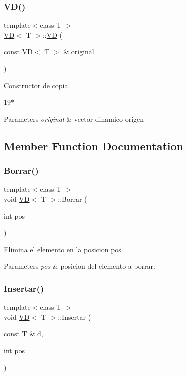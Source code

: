 \subsubsection{\texorpdfstring{V\+D()}{VD()}\hspace{0.1cm}{\footnotesize\ttfamily [2/2]}}
{\footnotesize\ttfamily template$<$class T $>$ \\
\hyperlink{class_v_d}{VD}$<$ T $>$\+::\hyperlink{class_v_d}{VD} (\begin{DoxyParamCaption}\item[{const \hyperlink{class_v_d}{VD}$<$ T $>$ \&}]{original }\end{DoxyParamCaption})}



Constructor de copia. 

19$\ast$
\begin{DoxyParams}{Parameters}
{\em original} & vector dinamico origen \\
\hline
\end{DoxyParams}


\subsection{Member Function Documentation}
\mbox{\label{class_v_d_a13528c6fae34510d10699f426de88e27}} 
\subsubsection{\texorpdfstring{Borrar()}{Borrar()}}
{\footnotesize\ttfamily template$<$class T $>$ \\
void \hyperlink{class_v_d}{VD}$<$ T $>$\+::Borrar (\begin{DoxyParamCaption}\item[{int}]{pos }\end{DoxyParamCaption})}



Elimina el elemento en la posicion pos. 


\begin{DoxyParams}{Parameters}
{\em pos} & posicion del elemento a borrar. \\
\hline
\end{DoxyParams}
\mbox{\label{class_v_d_aded65b5f02cceb9780303afd5c88acb8}} 
\subsubsection{\texorpdfstring{Insertar()}{Insertar()}}
{\footnotesize\ttfamily template$<$class T $>$ \\
void \hyperlink{class_v_d}{VD}$<$ T $>$\+::Insertar (\begin{DoxyParamCaption}\item[{const T \&}]{d,  }\item[{int}]{pos }\end{DoxyParamCaption})}



